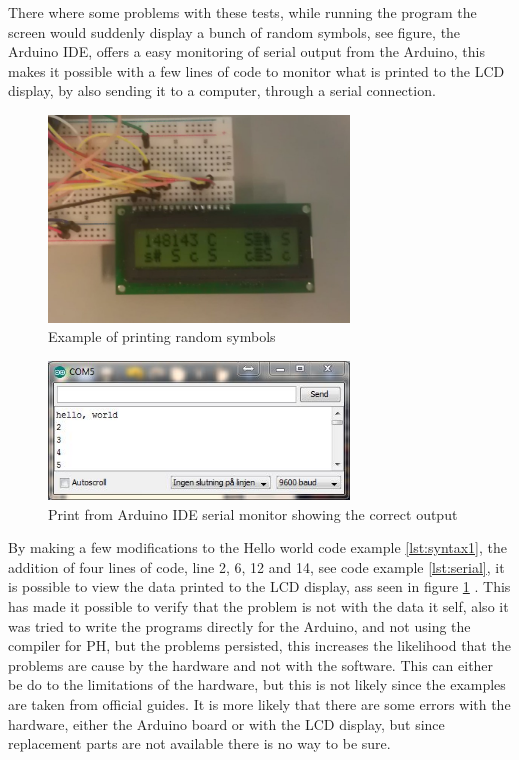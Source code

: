 There where some problems with these tests, while running the program the screen would suddenly display a bunch of random symbols, see figure, the Arduino IDE, offers a easy monitoring of serial output from the Arduino, this makes it possible with a few lines of code to monitor what is printed to the LCD display, by also sending it to a computer, through a serial connection.
\begin{figure}[h]
\centering
\includegraphics[width=8cm]{billeder/test_giberish.jpg}
\caption{Example of printing random symbols}
\end{figure}
\begin{figure}[hbtp]
\centering
\includegraphics[width=8cm]{billeder/arduino_serial_output.JPG}
\caption{Print from Arduino IDE serial monitor showing the correct output}
\label{fig:serial}
\end{figure}

By making a few modifications to the Hello world code example \ref{lst:syntax1}, the addition of four lines of code, line 2, 6, 12 and 14, see code example \ref{lst:serial}, it is possible to view the data printed to the LCD display, ass seen in figure \ref{fig:serial} . This has made it possible to verify that the problem is not with the data it self, also it was tried to write the programs directly for the Arduino, and not using the compiler for PH, but the problems persisted, this increases the likelihood that the problems are cause by the hardware and not with the software. This can either be do to the limitations of the hardware, but this is not likely since the examples are taken from official guides. It is more likely that there are some errors with the hardware, either the Arduino board or with the LCD display, but since replacement parts are not available there is no way to be sure.


